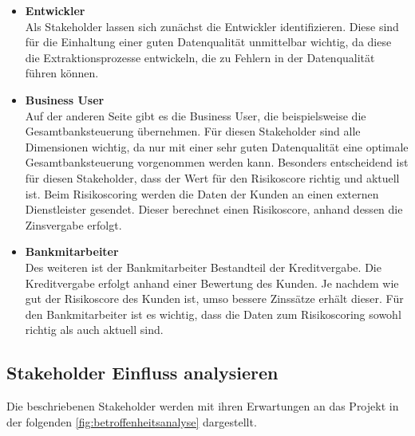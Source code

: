 \begin{itemize}
\item \textbf{Entwickler} \\            
Als Stakeholder lassen sich zunächst die Entwickler identifizieren.
Diese sind für die Einhaltung einer guten Datenqualität unmittelbar wichtig, da diese die Extraktionsprozesse entwickeln, die zu Fehlern in der Datenqualität führen können.



\item \textbf{Business User}       \\
Auf der anderen Seite gibt es die Business User, die beispielsweise die Gesamtbanksteuerung übernehmen.
Für diesen Stakeholder sind alle Dimensionen wichtig, da nur mit einer sehr guten Datenqualität eine optimale Gesamtbanksteuerung vorgenommen werden kann. 
Besonders entscheidend ist für diesen Stakeholder, dass der Wert für den Risikoscore richtig und aktuell ist.
Beim Risikoscoring werden die Daten der Kunden an einen externen Dienstleister gesendet.
Dieser berechnet einen Risikoscore, anhand dessen die Zinsvergabe erfolgt.

\item \textbf{Bankmitarbeiter}      \\
Des weiteren ist der Bankmitarbeiter Bestandteil der Kreditvergabe. 
Die Kreditvergabe erfolgt anhand einer Bewertung des Kunden.
Je nachdem wie gut der Risikoscore des Kunden ist, umso bessere Zinssätze erhält dieser.
Für den Bankmitarbeiter ist es wichtig, dass die Daten zum Risikoscoring sowohl richtig als auch aktuell sind.

\end{itemize}

\newpage
\subsection{Stakeholder Einfluss analysieren}
Die beschriebenen Stakeholder werden mit ihren Erwartungen an das Projekt in der folgenden \autoref{fig:betroffenheitsanalyse} dargestellt.

